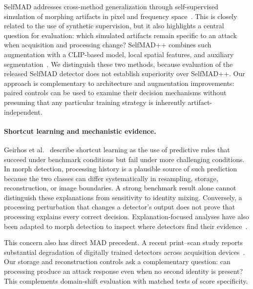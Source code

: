 SelfMAD addresses cross-method generalization through self-supervised simulation of morphing artifacts in pixel and frequency space~\cite{ivanovska2025selfmad}. This is closely related to the use of synthetic supervision, but it also highlights a central question for evaluation: which simulated artifacts remain specific to an attack when acquisition and processing change? SelfMAD++ combines such augmentation with a CLIP-based model, local spatial features, and auxiliary segmentation~\cite{ivanovska2026selfmadpp}. We distinguish these two methods, because evaluation of the released SelfMAD detector does not establish superiority over SelfMAD++. Our approach is complementary to architecture and augmentation improvements: paired controls can be used to examine their decision mechanisms without presuming that any particular training strategy is inherently artifact-independent.

\paragraph{Shortcut learning and mechanistic evidence.}
Geirhos et al.~\cite{geirhos2020shortcut} describe shortcut learning as the use of predictive rules that succeed under benchmark conditions but fail under more challenging conditions. In morph detection, processing history is a plausible source of such prediction because the two classes can differ systematically in resampling, storage, reconstruction, or image boundaries. A strong benchmark result alone cannot distinguish these explanations from sensitivity to identity mixing. Conversely, a processing perturbation that changes a detector's output does not prove that processing explains every correct decision. Explanation-focused analyses have also been adapted to morph detection to inspect where detectors find their evidence~\cite{seibold2021focusedlrp}.

This concern also has direct MAD precedent. A recent print--scan study reports substantial degradation of digitally trained detectors across acquisition devices~\cite{paulo2026printed}. Our storage and reconstruction controls ask a complementary question: can processing produce an attack response even when no second identity is present? This complements domain-shift evaluation with matched tests of score specificity.

